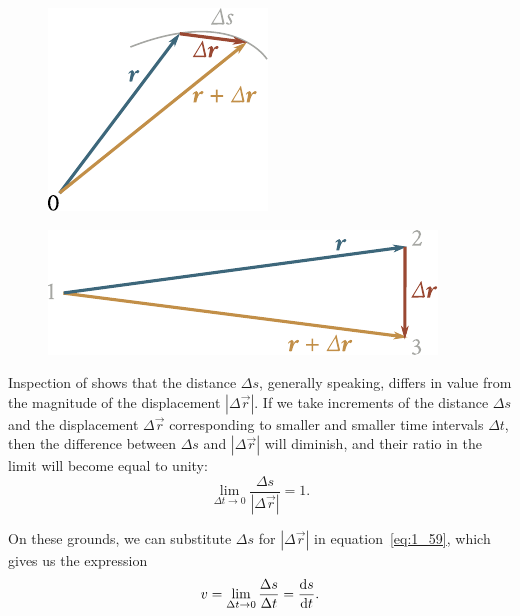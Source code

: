 \begin{figure}[t]
	\begin{minipage}[t]{0.5\linewidth}
		\begin{center}
			\includegraphics[scale=0.92]{figures/ch_01/fig_1_23.pdf}
			\caption[]{}
			\label{fig:1_23}
		\end{center}
	\end{minipage}
	\hfill{ }%
	\begin{minipage}[t]{0.5\linewidth}
		\begin{center}
			\includegraphics[scale=0.9]{figures/ch_01/fig_1_24.pdf}
			\caption[]{}
			\label{fig:1_24}
		\end{center}
	\end{minipage}
\vspace{-0.7cm}
\end{figure}

Inspection of  shows that the distance $\Delta s$, generally speaking, differs in value from the magnitude of the displacement $|\Delta\vec{r}|$. If we take increments of the distance $\Delta s$ and the displacement $\Delta\vec{r}$ corresponding to smaller and smaller time intervals $\Delta t$, then the difference between $\Delta s$ and $|\Delta\vec{r}|$ will diminish, and their ratio in the limit will become equal to unity:
\begin{equation*}
\lim_{\Delta t\to 0} \frac{\Delta s}{|\Delta\vec{r}|} = 1.
\end{equation*}

\noindent
On these grounds, we can substitute $\Delta s$ for $|\Delta\vec{r}|$ in equation~\eqref{eq:1_59}, which gives us the expression
\begin{equation}\label{eq:1_60}
v = \lim_{\Delta t\to 0} \frac{\Delta s}{\Delta t} = \frac{\mathrm{d} s}{\mathrm{d} t}.
\end{equation}

